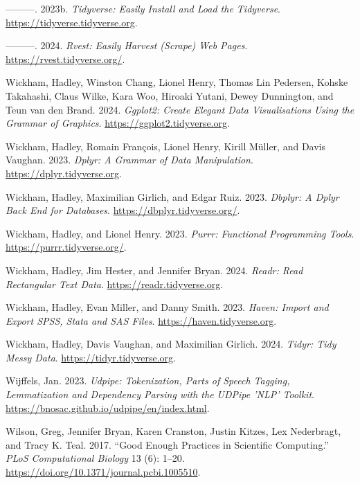 \documentclass[
  letterpaper,
]{latex/krantz}
\newlength{\cslhangindent}
\newenvironment{CSLReferences}[2] %
 {\begin{list}{}{%
  \setlength{\itemindent}{0pt}
  \setlength{\leftmargin}{0pt}
  \setlength{\parsep}{0pt}
  \ifodd #1
   \setlength{\leftmargin}{\cslhangindent}
   \setlength{\itemindent}{-1\cslhangindent}
  \fi
  \setlength{\itemsep}{#2\baselineskip}}}
 {\end{list}}
\theoremstyle{definition}
\theoremstyle{remark}
\begin{document}
\begin{CSLReferences}{1}{0}
---------. 2023b. \emph{Tidyverse: Easily Install and Load the
Tidyverse}. \url{https://tidyverse.tidyverse.org}.

---------. 2024. \emph{Rvest: Easily Harvest (Scrape) Web Pages}.
\url{https://rvest.tidyverse.org/}.

Wickham, Hadley, Winston Chang, Lionel Henry, Thomas Lin Pedersen,
Kohske Takahashi, Claus Wilke, Kara Woo, Hiroaki Yutani, Dewey
Dunnington, and Teun van den Brand. 2024. \emph{Ggplot2: Create Elegant
Data Visualisations Using the Grammar of Graphics}.
\url{https://ggplot2.tidyverse.org}.

Wickham, Hadley, Romain François, Lionel Henry, Kirill Müller, and Davis
Vaughan. 2023. \emph{Dplyr: A Grammar of Data Manipulation}.
\url{https://dplyr.tidyverse.org}.

Wickham, Hadley, Maximilian Girlich, and Edgar Ruiz. 2023. \emph{Dbplyr:
A Dplyr Back End for Databases}. \url{https://dbplyr.tidyverse.org/}.

Wickham, Hadley, and Lionel Henry. 2023. \emph{Purrr: Functional
Programming Tools}. \url{https://purrr.tidyverse.org/}.

Wickham, Hadley, Jim Hester, and Jennifer Bryan. 2024. \emph{Readr: Read
Rectangular Text Data}. \url{https://readr.tidyverse.org}.

Wickham, Hadley, Evan Miller, and Danny Smith. 2023. \emph{Haven: Import
and Export SPSS, Stata and SAS Files}.
\url{https://haven.tidyverse.org}.

Wickham, Hadley, Davis Vaughan, and Maximilian Girlich. 2024.
\emph{Tidyr: Tidy Messy Data}. \url{https://tidyr.tidyverse.org}.

Wijffels, Jan. 2023. \emph{Udpipe: Tokenization, Parts of Speech
Tagging, Lemmatization and Dependency Parsing with the UDPipe 'NLP'
Toolkit}. \url{https://bnosac.github.io/udpipe/en/index.html}.

Wilson, Greg, Jennifer Bryan, Karen Cranston, Justin Kitzes, Lex
Nederbragt, and Tracy K. Teal. 2017. {``Good Enough Practices in
Scientific Computing.''} \emph{PLoS Computational Biology} 13 (6):
1--20. \url{https://doi.org/10.1371/journal.pcbi.1005510}.


\end{CSLReferences}
\end{document}
